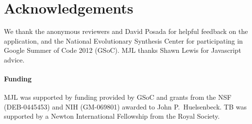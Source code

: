 \documentclass{bioinfo}
\begin{document}
\section*{Acknowledgements}

We thank the anonymous reviewers and David Posada for helpful feedback on the application, and the National Evolutionary Synthesis Center for participating in Google Summer of Code 2012 (GSoC). MJL thanks Shawn Lewis for Javascript advice.

\paragraph{Funding\textcolon} 
MJL was supported by funding provided by GSoC and grants from the NSF (DEB-0445453) and NIH (GM-069801) awarded to John P.\ Huelsenbeck.  TB was supported by a Newton International Fellowship from the Royal Society.  


\end{document}
